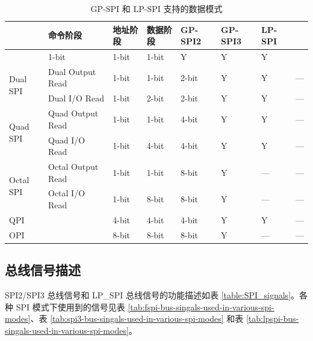 \documentclass[main\_\_CN.tex]{subfiles}
\begin{document}
\begin{longtable}{|l|l|l|l|l|l|l|l|}
\caption{GP-SPI 和 LP-SPI 支持的数据模式}
\label{tab:data-modes}\\
\hline
\rowcolor{lightgray} 
\multicolumn{2}{|l|}{\textbf{数据模式}}            & \textbf{命令阶段}& \textbf{地址阶段}& \textbf{数据阶段}& \textbf{GP-SPI2} & \textbf{GP-SPI3} & \textbf{LP-SPI}\\ \hline
\endfirsthead
        \endlastfoot
\multicolumn{2}{|l|}{1-bit SPI}                       & 1-bit   & 1-bit       & 1-bit    & Y       & Y    & Y     \\ \hline
\multirow{2}{*}{Dual   SPI} & Dual Output Read  & 1-bit   & 1-bit       & 2-bit    & Y       & Y   & ---   \\ \cline{2-8} 
                            & Dual I/O Read     & 1-bit   & 2-bit       & 2-bit    & Y       & Y   & ---  \\ \hline
\multirow{2}{*}{Quad SPI}   & Quad Output Read  & 1-bit   & 1-bit       & 4-bit    & Y       & Y   & ---   \\ \cline{2-8} 
                            & Quad I/O Read     & 1-bit   & 4-bit       & 4-bit    & Y       & Y   & ---   \\ \hline
\multirow{2}{*}{Octal SPI}  & Octal Output Read & 1-bit   & 1-bit       & 8-bit    & Y       & --- & ---     \\ \cline{2-8} 
                            & Octal I/O Read    & 1-bit   & 8-bit       & 8-bit    & Y       & --- & ---     \\ \hline
\multicolumn{2}{|l|}{QPI}                       & 4-bit   & 4-bit       & 4-bit    & Y       & Y   & ---  \\ \hline
\multicolumn{2}{|l|}{OPI}                       & 8-bit   & 8-bit       & 8-bit    & Y       & --- & ---     \\ \hline
\end{longtable}



\subsection{总线信号描述}

SPI2/SPI3 总线信号和 LP\_SPI 总线信号的功能描述如表 \ref{table:SPI_signals}。各种 SPI 模式下使用到的信号见表 \ref{tab:fspi-bus-singals-used-in-various-spi-modes}、表 \ref{tab:spi3-bus-singals-used-in-various-spi-modes} 和表 \ref{tab:lpspi-bus-singals-used-in-various-spi-modes}。 
\end{document}
